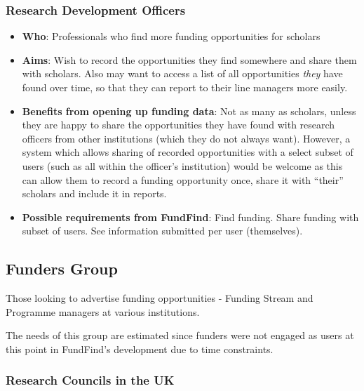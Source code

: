 \subsubsection{Research Development Officers}
\label{audience-research-officers}
\begin{itemize}
 \item \textbf{Who}: Professionals who find more funding opportunities for scholars
 \item \textbf{Aims}: Wish to record the opportunities they find somewhere and share them with scholars. Also may want to access a list of all opportunities \emph{they} have found over time, so that they can report to their line managers more easily.
 \item \textbf{Benefits from opening up funding data}: Not as many as scholars, unless they are happy to share the opportunities they have found with research officers from other institutions (which they do not always want). However, a system which allows sharing of recorded opportunities with a select subset of users (such as all within the officer's institution) would be welcome as this can allow them to record a funding opportunity once, share it with ``their'' scholars and include it in reports.
 \item \textbf{Possible requirements from FundFind}: Find funding. Share funding with subset of users. See information submitted per user (themselves).
\end{itemize}

\subsection{Funders Group}
Those looking to advertise funding opportunities - Funding Stream and Programme managers at various institutions.

The needs of this group are estimated since funders were not engaged as users at this point in FundFind's development due to time constraints.

\subsubsection{Research Councils in the UK}

